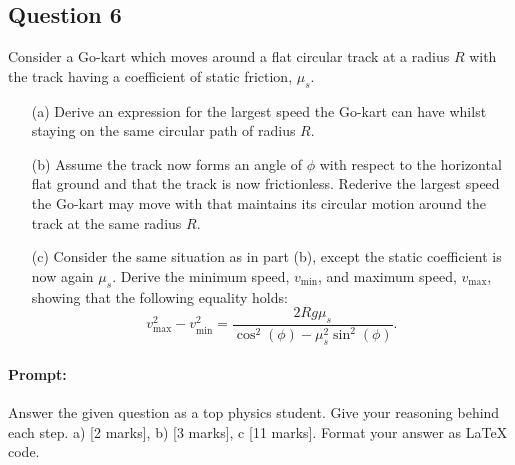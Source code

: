 \documentclass{article}
\begin{document}
\subsection{Question 6}

Consider a Go-kart which moves around a flat circular track at a radius $R$ with the track having a coefficient of static friction, $\mu_s$.

\begin{enumerate}
    \item[(a)] Derive an expression for the largest speed the Go-kart can have whilst staying on the same circular path of radius $R$.
    
    \item[(b)] Assume the track now forms an angle of $\phi$ with respect to the horizontal flat ground and that the track is now frictionless. Rederive the largest speed the Go-kart may move with that maintains its circular motion around the track at the same radius $R$.
    
    \item[(c)] Consider the same situation as in part (b), except the static coefficient is now again $\mu_s$. Derive the minimum speed, $v_{\text{min}}$, and maximum speed, $v_{\text{max}}$, showing that the following equality holds:
    \[
    v^2_{\text{max}} - v^2_{\text{min}} = \frac{2R g \mu_s}{\cos^2(\phi) - \mu_s^2 \sin^2(\phi)}.
    \]
\end{enumerate}

\paragraph{Prompt: \\} 
Answer the given question as a top physics student. Give your reasoning behind each step. a) [2 marks], b) [3 marks], c [11 marks].
Format your answer as LaTeX code.
\end{document}
